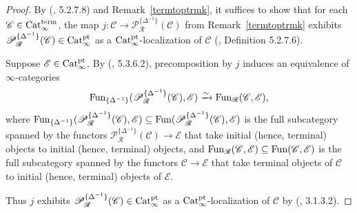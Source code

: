\documentclass{tac}
\newcommand{\s}[1]{\mathscr{#1}}
\newcommand{\maybehat}[1]{#1} %
\newcommand{\tx}[1]{\textnormal{#1}}
\begin{document}
\begin{proof} By (\cite{htt}, 5.2.7.8) and Remark~\ref{termtoptrmk}, it suffices to show that for each $\s{C}\in \maybehat{\tx{Cat}}_\infty^\tx{term}$, the map $j : \s{C} \to \s{P}^{\{ \Delta^{-1} \}}_{\s{R}}(\s{C})$ from Remark~\ref{termtoptrmk} exhibits $\s{P}^{\{ \Delta^{-1} \}}_{\s{R}}(\s{C}) \in \maybehat{\tx{Cat}}_\infty^\tx{pt}$ as a $\maybehat{\tx{Cat}}_\infty^\tx{pt}$-localization of $\s{C}$ (\cite{htt}, Definition 5.2.7.6).

Suppose $\s{E} \in \maybehat{\tx{Cat}}_\infty^\tx{pt}$.  By (\cite{htt}, 5.3.6.2), precomposition by $j$ induces an equivalence of $\infty$-categories
\[ \tx{Fun}_{\{ \Delta^{-1}\}} (\s{P}^{\{ \Delta^{-1} \}}_{\s{R}}(\s{C}), \s{E}) \xrightarrow{\sim} \tx{Fun}_{\s{R}} (\s{C}, \s{E}), \] 
where $\tx{Fun}_{\{ \Delta^{-1}\}} (\s{P}^{\{ \Delta^{-1} \}}_{\s{R}}(\s{C}), \s{E})\subseteq \tx{Fun} (\s{P}^{\{ \Delta^{-1} \}}_{\s{R}}(\s{C}), \s{E}) $ is the full subcategory spanned by the functors $\s{P}^{\{ \Delta^{-1} \}}_{\s{R}}(\s{C})\to \s{E}$ that take initial (hence, terminal) objects to initial (hence, terminal) objects, and $ \tx{Fun}_{\s{R}} (\s{C}, \s{E}) \subseteq  \tx{Fun} (\s{C}, \s{E})$ is the full subcategory spanned by the functors $\s{C} \to \s{E}$ that take terminal objects of $\s{C}$ to initial (hence, terminal) objects of $\s{E}$.

Thus $j$ exhibits $\s{P}^{\{ \Delta^{-1} \}}_{\s{R}}(\s{C}) \in \maybehat{\tx{Cat}}_\infty^\tx{pt}$ as a $\maybehat{\tx{Cat}}_\infty^\tx{pt}$-localization of $\s{C}$ by (\cite{htt}, 3.1.3.2).
\end{proof}
\end{document}
